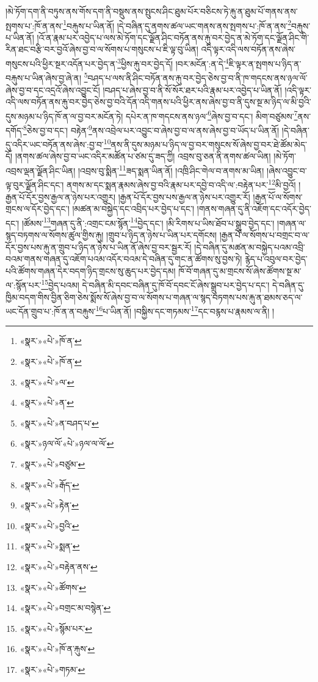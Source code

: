 །མེ་ཏོག་དག་ནི་བཏུས་ནས་གོས་དག་ནི་བསྡུས་ནས་སྤུངས་ཤིང་ཐུམ་པོར་བཅིངས་ཏེ་རྐུ་ན་ཐུམ་པོ་གནས་ནས་སྤགས་པ་:ཁོ་ན་ནས་\footnote{«སྣར་»«པེ་»ཁོ་ན་}བརྐུས་པ་ཡིན་ནོ། །དེ་བཞིན་དུ་ནགས་ཚལ་ཡང་གནས་ནས་སྤགས་པ་:ཁོ་ན་ནས་\footnote{«སྣར་»«པེ་»ཁོ་ན་}བརྐུས་པ་ཡིན་ནོ། །འོ་ན་རྣམ་པར་འབྱེད་པ་ལས་མེ་ཏོག་དང་ལྗོན་ཤིང་བཏོན་ནས་རྐུ་བར་བྱེད་ན་མེ་ཏོག་དང་ལྗོན་ཤིང་གི་རིན་ཐང་བརྩི་བར་བྱའོ་ཞེས་བྱ་བ་ལ་སོགས་པ་གསུངས་པ་ཇི་ལྟ་བུ་ཡིན། འདི་ལྟར་འདི་ལས་བཏོན་ནས་ཞེས་གསུངས་པའི་ཕྱིར་སྔར་འདོན་པར་བྱེད་ན་\footnote{«སྣར་»«པེ་»ལ་}ཕྱིས་རྐུ་བར་བྱེད་དོ། །བར་མངོན་:ན་དེ་\footnote{«སྣར་»«པེ་»ན་}ཇི་ལྟར་ན་སྤགས་པ་ཉིད་ན་བརྐུས་པ་ཡིན་ཞེས་བྱ་ཞེ་ན། \footnote{«སྣར་»«པེ་»ན་བཤད་པ་}བཤད་པ་ལས་ནི་ཤིང་བཏོན་ནས་རྐུ་བར་བྱེད་ཅེས་བྱ་བ་ནི་ཁ་གདངས་ནས་ཉལ་ལོ་ཞེས་བྱ་བ་དང་འདྲའོ་ཞེས་འབྱུང་ངོ། །བཤད་པ་ཞེས་བྱ་བ་ནི་སོ་སོར་ཐར་པའི་རྣམ་པར་འབྱེད་པ་ཡིན་ནོ། །འདི་ལྟར་འདི་ལས་བཏོན་ནས་རྐུ་བར་བྱེད་ཅེས་བྱ་བའི་དོན་འདི་གནས་པའི་ཕྱིར་ནས་ཞེས་བྱ་བ་ནི་དུས་སྔ་མ་ཉིད་ལ་མི་བྱའི་དུས་མཉམ་པ་ཉིད་ཁོ་ན་ལ་བྱ་བར་མངོན་ཏེ། དཔེར་ན་ཁ་གདངས་ནས་ཉལ་\footnote{«སྣར་»ཉལ་ལོ་«པེ་»ཉལ་ལ་ལོ་}ཞེས་བྱ་བ་དང་། མིག་བཙུམས་\footnote{«སྣར་»«པེ་»བཙུམ་}ནས་དགོད་\footnote{«སྣར་»«པེ་»རྒོད་}ཅེས་བྱ་བ་དང་། བརྟེན་\footnote{«སྣར་»«པེ་»རྟེན་}ནས་འབྲེལ་པར་འབྱུང་བ་ཞེས་བྱ་བ་ལ་ནས་ཞེས་བྱ་བ་ཡོད་པ་ཡིན་ནོ། །དེ་བཞིན་དུ་འདིར་ཡང་བཏོན་ནས་ཞེས་:བྱ་བ་\footnote{«སྣར་»«པེ་»བྱའི་}ནས་ནི་དུས་མཉམ་པ་ཉིད་ལ་བྱ་བར་གསུངས་སོ་ཞེས་བྱ་བར་ཐེ་ཚོམ་མེད་དོ། །ནགས་ཚལ་ཞེས་བྱ་བ་ཡང་འདིར་མཚོན་པ་ཙམ་དུ་ཟད་ཀྱི། འབྲས་བུ་ཅན་ནི་ནགས་ཚལ་ཡིན། །མེ་ཏོག་འབྲས་ལྡན་ལྗོན་ཤིང་ཡིན། །འབྲས་བུ་སྨིན་\footnote{«སྣར་»«པེ་»སྨན་}ཟད་སྨན་ཡིན་ནོ། །འཁྲི་ཤིང་གེལ་བ་ནགས་མ་ཡིན། །ཞེས་འབྱུང་བ་ལྟ་བུར་ལྗོན་ཤིང་དང་། ནགས་མ་དང་སྨན་རྣམས་ཞེས་བྱ་བའི་རྣམ་པར་དབྱེ་བ་འདི་ལ་:བརྟེན་པར་\footnote{«སྣར་»«པེ་»བརྟེན་ནས་}མི་བྱའོ། །རྒྱན་པོ་དོར་བྱས་རྒྱལ་ན་ཉེས་པར་འགྱུར། །རྒྱན་པོ་དོར་བྱས་པས་རྒྱལ་ན་ཉེས་པར་འགྱུར་རོ། །རྒྱན་པོ་ལ་སོགས་གྲངས་ལ་དོར་བྱེད་དང་། །མཚན་མ་བསྐྱེད་དང་འབྲིད་པར་བྱེད་པ་དང་། །གནས་གཞན་དུ་ནི་འཇོག་དང་འདོར་བྱེད་དང་། །ཚོམས་\footnote{«སྣར་»«པེ་»ཚོགས་}གཞན་དུ་ནི་:འགྲང་ངམ་སྙོན་\footnote{«སྣར་»«པེ་»བགྲང་མ་བསྙེན་}བྱེད་དང་། །མི་རིགས་པ་ཡིས་ཐོབ་པ་སྒྲུབ་བྱེད་དང་། །གཞན་ལ་སྙད་བཏགས་ལ་སོགས་ཚུལ་གྱིས་རྐུ། །གྲུབ་པ་ཉིད་ན་ཉེས་པ་ཡིན་པར་དགོངས། །རྒྱན་པོ་ལ་སོགས་པ་བགྲང་བ་ལ་དོར་བྱས་པས་རྐུ་ན་གྲུབ་པ་ཉིད་ན་ཉེས་པ་ཡིན་ནོ་ཞེས་བྱ་བར་སྦྱར་རོ། །དེ་བཞིན་དུ་མཚན་མ་བསྐྱེད་པའམ་འབྲི་བའམ་གནས་གཞན་དུ་འཇོག་པའམ་འདོར་བའམ་དེ་བཞིན་དུ་གང་ན་ཚོགས་སུ་བྱས་ཏེ། རྙེད་པ་འབུལ་བར་བྱེད་པའི་ཚོགས་གཞན་དེར་བདག་ཉིད་གྲངས་སུ་ཆུད་པར་བྱེད་དམ། ཁོ་བོ་གཞན་དུ་མ་གྲངས་སོ་ཞེས་ཚོགས་སྔ་མ་ལ་:སྙོན་པར་\footnote{«སྣར་»«པེ་»སྙོམ་པར་}བྱེད་པའམ། དེ་བཞིན་མི་དབང་བཞིན་དུ་ཁོ་བོ་དབང་ངོ་ཞེས་སྒྲུབ་པར་བྱེད་པ་དང་། དེ་བཞིན་དུ་ཁྱིམ་བདག་གིས་བྱིན་ཅིག་ཅེས་སྨོས་སོ་ཞེས་བྱ་བ་ལ་སོགས་པ་གཞན་ལ་སྙད་བཏགས་པས་རྐུ་ན་ཐམས་ཅད་ལ་ཡང་དོན་གྲུབ་པ་:ཁོ་ན་ན་བརྐུས་\footnote{«སྣར་»«པེ་»ཁོ་ན་རྐུས་}པ་ཡིན་ནོ། །བསྐྱིས་དང་གཏམས་\footnote{«སྣར་»«པེ་»གཏམ་}དང་བརྙས་པ་རྣམས་ལ་ནི། །
